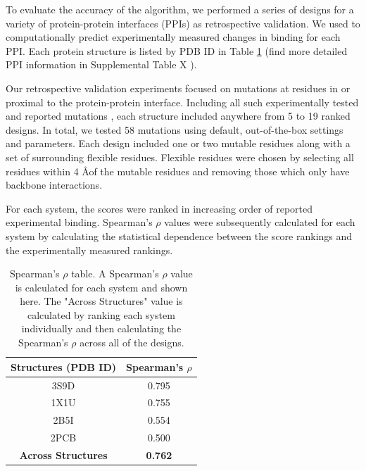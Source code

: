 To evaluate the accuracy of the \osprey \ks algorithm, we performed a series of designs for a variety of protein-protein interfaces (PPIs) as retrospective validation. We used \ks to computationally predict experimentally measured changes in binding for each PPI. Each protein structure is listed by PDB ID in Table \ref{table:spearman} \cite{pdb1x1u,pdb2pcb,pdb3s9d,pdb2b5i}(find more detailed PPI information in Supplemental Table X ).


Our retrospective validation experiments focused on mutations at residues in or proximal to the protein-protein interface. Including all such experimentally tested and reported mutations \cite{binding2barnase,bindingbarnase,bindingcytc,bindingifna2,bindingil2}, each structure included anywhere from 5 to 19 ranked designs. In total, we tested 58 mutations using default, out-of-the-box \osprey settings and parameters. Each design included one or two mutable residues along with a set of surrounding flexible residues. Flexible residues were chosen by selecting all residues within 4 \AA of the mutable residues and removing those which only have backbone interactions. 

For each system, the \ks scores were ranked in increasing order of reported experimental binding. Spearman's $\rho$ values were subsequently calculated for each system by calculating the statistical dependence between the \ks score rankings and the experimentally measured rankings. 

\begin{table}[h!]\label{table:spearman}
\centering
\begin{tabular}{ |c||c|  }
 \hline
 \textbf{Structures (PDB ID)}& \textbf{Spearman's $\rho$} \\
 \hline 
 3S9D   & 0.795 \\
 \hline
 1X1U   & 0.755 \\
 \hline
 2B5I   & 0.554 \\
 \hline
 2PCB   & 0.500 \\
 \hline
 \textbf{Across Structures} &   \textbf{0.762}  \\
 \hline
\end{tabular}
\caption{Spearman's $\rho$ table. A Spearman's $\rho$ value is calculated for each system and shown here. The "Across Structures" value is calculated by ranking each system individually and then calculating the Spearman's $\rho$ across all of the designs.}
\end{table}

